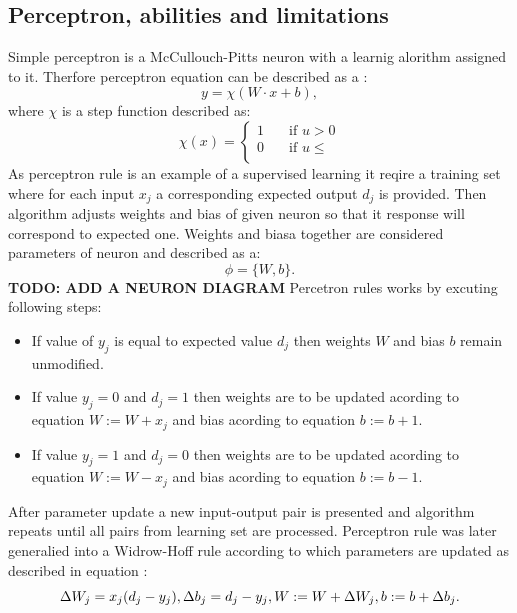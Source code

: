 \subsection{Perceptron, abilities and limitations}
Simple perceptron is a McCullouch-Pitts neuron with a learnig alorithm assigned to it.
Therfore perceptron equation can be described as a :
\begin{equation}
	y = \chi (W\cdot x+b),
\end{equation}
where $\chi$ is a step function described as:
\begin{equation}
	\chi (x) =  
	\begin{cases}
		1       & \quad \text{if } u > 0\\
		0       & \quad \text{if } u \leq \\
	\end{cases}
\end{equation}
As perceptron rule is an example of a supervised learning it reqire a training set where for 
each input $x_{j}$ a corresponding expected output $d_{j}$ is provided. 
Then algorithm adjusts weights and bias of given neuron so that it response will 
correspond to expected one. 
Weights and biasa together are considered parameters of neuron and described as a:
\begin{equation}
	\phi = \{ W,b \}.
\end{equation}
\textbf{TODO: ADD A NEURON DIAGRAM}
Percetron rules works by excuting following steps:
\begin{itemize}
	\item If value of $y_{j}$ is equal to expected value $d_{j}$ then weights $W$ and 
		  bias $b$ remain unmodified.
	\item If value $y_{j}=0$ and $d_{j}=1$ then weights are to be updated acording to 
		  equation $W:=W+x_{j}$ and bias acording to equation $b:=b+1$.
	\item If value $y_{j}=1$ and $d_{j}=0$ then weights are to be updated acording to 
		  equation $W:=W-x_{j}$ and bias acording to equation $b:=b-1$.
\end{itemize}
After parameter update a new input-output pair is presented and algorithm repeats until all 
pairs from learning set are processed.
Perceptron rule was later generalied into a Widrow-Hoff rule according to which parameters are 
updated as described in equation :
\begin{equation}
	\Delta W_{j} = x_{j}(d_{j}-y_{j}),\\
	\Delta b_{j} = d_{j} - y_{j},\\
	W :=  W + \Delta W_{j},\\
	b := b + \Delta b_{j}.
\end{equation}
